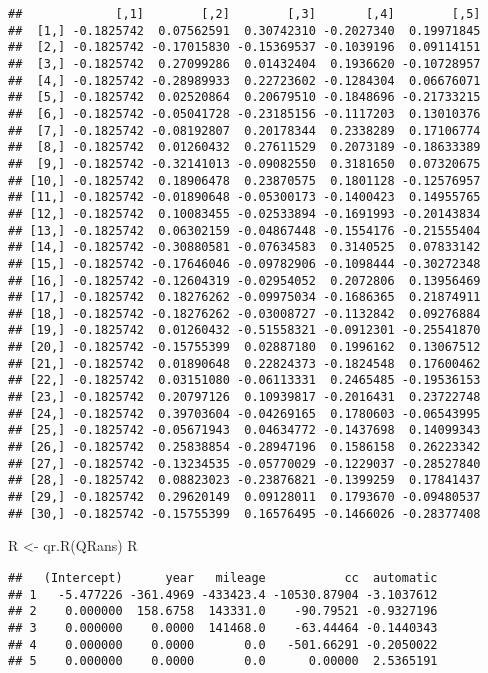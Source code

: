 \documentclass[
]{book}
\newenvironment{Shaded}{\begin{snugshade}}{\end{snugshade}}
\newcommand{\FunctionTok}[1]{\textcolor[rgb]{0.00,0.00,0.00}{#1}}
\newcommand{\NormalTok}[1]{#1}
\newcommand{\OtherTok}[1]{\textcolor[rgb]{0.56,0.35,0.01}{#1}}
\begin{document}
\begin{verbatim}
##             [,1]        [,2]        [,3]       [,4]        [,5]
##  [1,] -0.1825742  0.07562591  0.30742310 -0.2027340  0.19971845
##  [2,] -0.1825742 -0.17015830 -0.15369537 -0.1039196  0.09114151
##  [3,] -0.1825742  0.27099286  0.01432404  0.1936620 -0.10728957
##  [4,] -0.1825742 -0.28989933  0.22723602 -0.1284304  0.06676071
##  [5,] -0.1825742  0.02520864  0.20679510 -0.1848696 -0.21733215
##  [6,] -0.1825742 -0.05041728 -0.23185156 -0.1117203  0.13010376
##  [7,] -0.1825742 -0.08192807  0.20178344  0.2338289  0.17106774
##  [8,] -0.1825742  0.01260432  0.27611529  0.2073189 -0.18633389
##  [9,] -0.1825742 -0.32141013 -0.09082550  0.3181650  0.07320675
## [10,] -0.1825742  0.18906478  0.23870575  0.1801128 -0.12576957
## [11,] -0.1825742 -0.01890648 -0.05300173 -0.1400423  0.14955765
## [12,] -0.1825742  0.10083455 -0.02533894 -0.1691993 -0.20143834
## [13,] -0.1825742  0.06302159 -0.04867448 -0.1554176 -0.21555404
## [14,] -0.1825742 -0.30880581 -0.07634583  0.3140525  0.07833142
## [15,] -0.1825742 -0.17646046 -0.09782906 -0.1098444 -0.30272348
## [16,] -0.1825742 -0.12604319 -0.02954052  0.2072806  0.13956469
## [17,] -0.1825742  0.18276262 -0.09975034 -0.1686365  0.21874911
## [18,] -0.1825742 -0.18276262 -0.03008727 -0.1132842  0.09276884
## [19,] -0.1825742  0.01260432 -0.51558321 -0.0912301 -0.25541870
## [20,] -0.1825742 -0.15755399  0.02887180  0.1996162  0.13067512
## [21,] -0.1825742  0.01890648  0.22824373 -0.1824548  0.17600462
## [22,] -0.1825742  0.03151080 -0.06113331  0.2465485 -0.19536153
## [23,] -0.1825742  0.20797126  0.10939817 -0.2016431  0.23722748
## [24,] -0.1825742  0.39703604 -0.04269165  0.1780603 -0.06543995
## [25,] -0.1825742 -0.05671943  0.04634772 -0.1437698  0.14099343
## [26,] -0.1825742  0.25838854 -0.28947196  0.1586158  0.26223342
## [27,] -0.1825742 -0.13234535 -0.05770029 -0.1229037 -0.28527840
## [28,] -0.1825742  0.08823023 -0.23876821 -0.1399259  0.17841437
## [29,] -0.1825742  0.29620149  0.09128011  0.1793670 -0.09480537
## [30,] -0.1825742 -0.15755399  0.16576495 -0.1466026 -0.28377408
\end{verbatim}

\begin{Shaded}
\begin{Highlighting}[]
\NormalTok{R }\OtherTok{\textless{}{-}} \FunctionTok{qr.R}\NormalTok{(QRans)}
\NormalTok{R}
\end{Highlighting}
\end{Shaded}

\begin{verbatim}
##   (Intercept)      year   mileage           cc  automatic
## 1   -5.477226 -361.4969 -433423.4 -10530.87904 -3.1037612
## 2    0.000000  158.6758  143331.0    -90.79521 -0.9327196
## 3    0.000000    0.0000  141468.0    -63.44464 -0.1440343
## 4    0.000000    0.0000       0.0   -501.66291 -0.2050022
## 5    0.000000    0.0000       0.0      0.00000  2.5365191
\end{verbatim}
\end{document}
